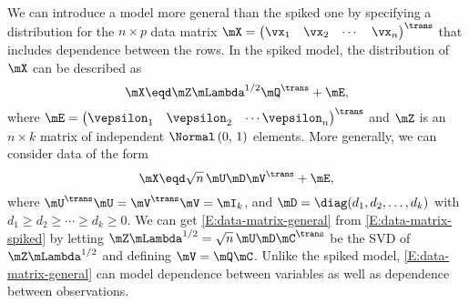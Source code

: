 We can introduce a model more general than the spiked one by specifying
a distribution for the $n\times p$ data matrix 
\(
    \mX
    =
    \left(
    \begin{matrix}
        \vx_1 &
        \vx_2 &
        \cdots &
        \vx_n
    \end{matrix}
    \right)^\trans
\)
that includes dependence between the rows.  In the spiked model, the
distribution of $\mX$ can be described as
\begin{equation}\label{E:data-matrix-spiked}
    \mX
        \eqd
        \mZ
        \mLambda^{1/2}
        \mQ^\trans
        +
        \mE,
\end{equation}
where 
\(
    \mE 
        = 
        \left(
        \begin{matrix}
            \vepsilon_1 & \vepsilon_2 & \cdots \vepsilon_n
        \end{matrix}
        \right)^\trans
\)
and $\mZ$ is an $n \times k$ matrix of independent 
$\Normal \left( 0, \, 1 \right)$ elements.  More generally, we can consider
data of the form
\begin{equation}\label{E:data-matrix-general}
    \mX
        \eqd
            \sqrt{n} \,
            \mU
            \mD
            \mV^\trans
            +
            \mE,
\end{equation}
where $\mU^\trans \mU = \mV^\trans \mV = \mI_k$, and 
$\mD = \diag( d_1, d_2, \ldots, d_k )$ with 
$d_1 \geq d_2 \geq \cdots \geq d_k \geq 0$.  
We can get \eqref{E:data-matrix-general}  from \eqref{E:data-matrix-spiked} by letting $\mZ \mLambda^{1/2} = \sqrt{n} \, \mU \mD \mC^\trans$ be the SVD of $\mZ \mLambda^{1/2}$ and defining $\mV = \mQ \mC$.  Unlike the spiked model, \eqref{E:data-matrix-general} can model dependence between variables as well as dependence between observations.
